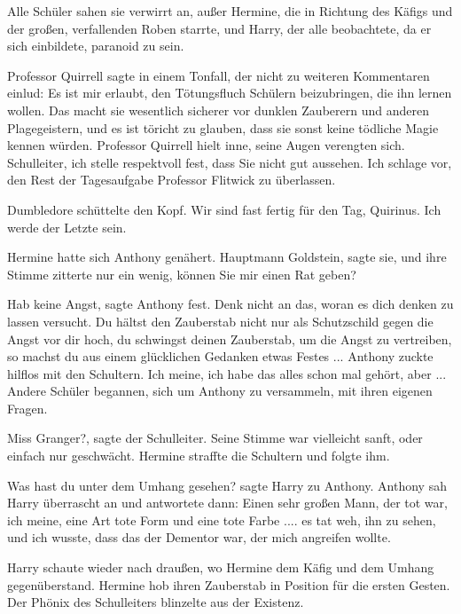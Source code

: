 Alle Schüler sahen sie verwirrt an, außer Hermine, die in Richtung des Käfigs
und der großen, verfallenden Roben starrte, und Harry, der alle beobachtete, da
er sich einbildete, paranoid zu sein.

Professor Quirrell sagte in einem Tonfall, der nicht zu weiteren Kommentaren
einlud: \glqq{}Es ist mir erlaubt, den Tötungsfluch Schülern beizubringen, die
ihn lernen wollen. Das macht sie wesentlich sicherer vor dunklen Zauberern und
anderen Plagegeistern, und es ist töricht zu glauben, dass sie sonst keine
tödliche Magie kennen würden.\grqq{} Professor Quirrell hielt inne, seine Augen
verengten sich. \glqq{}Schulleiter, ich stelle respektvoll fest, dass Sie nicht
gut aussehen. Ich schlage vor, den Rest der Tagesaufgabe Professor Flitwick zu
überlassen.\grqq{}

Dumbledore schüttelte den Kopf. \glqq{}Wir sind fast fertig für den Tag,
Quirinus. Ich werde der Letzte sein.\grqq{}

Hermine hatte sich Anthony genähert. \glqq{}Hauptmann Goldstein\grqq{}, sagte
sie, und ihre Stimme zitterte nur ein wenig, \glqq{}können Sie mir einen Rat
geben?\grqq{}

\glqq{}Hab keine Angst\grqq{}, sagte Anthony fest. \glqq{}Denk nicht an das, woran
es dich denken zu lassen versucht. Du hältst den Zauberstab nicht nur als
Schutzschild gegen die Angst vor dir hoch, du schwingst deinen Zauberstab, um
die Angst zu vertreiben, so machst du aus einem glücklichen Gedanken etwas
Festes ...\grqq{} Anthony zuckte hilflos mit den Schultern. \glqq{}Ich meine, ich habe
das alles schon mal gehört, aber ...\grqq{} Andere Schüler begannen, sich um Anthony
zu versammeln, mit ihren eigenen Fragen.

\glqq{}Miss Granger?\grqq{}, sagte der Schulleiter. Seine Stimme war vielleicht
sanft, oder einfach nur geschwächt. Hermine straffte die Schultern und folgte
ihm.

\glqq{}Was hast du unter dem Umhang gesehen?\grqq{} sagte Harry zu Anthony.
Anthony sah Harry überrascht an und antwortete dann: \glqq{}Einen sehr großen
Mann, der tot war, ich meine, eine Art tote Form und eine tote Farbe .... es tat
weh, ihn zu sehen, und ich wusste, dass das der Dementor war, der mich angreifen
wollte.\grqq{}

Harry schaute wieder nach draußen, wo Hermine dem Käfig und dem Umhang
gegenüberstand. Hermine hob ihren Zauberstab in Position für die ersten Gesten.
Der Phönix des Schulleiters blinzelte aus der Existenz.

